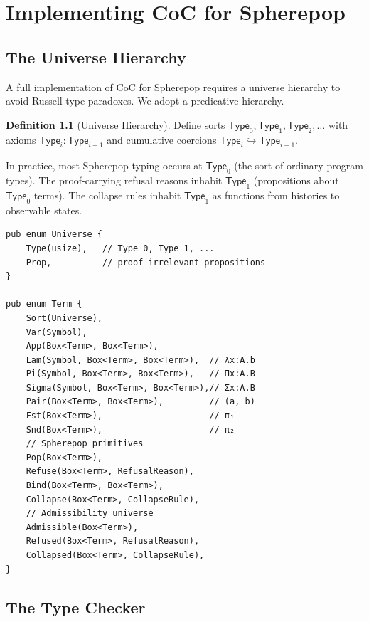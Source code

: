 \documentclass[12pt, a4paper, openany]{book}
\theoremstyle{plain}
\theoremstyle{definition}
\newtheorem{definition}[theorem]{Definition}
\theoremstyle{remark}
\begin{document}
\chapter{Implementing CoC for Spherepop}

\section{The Universe Hierarchy}

A full implementation of CoC for Spherepop requires a universe hierarchy to avoid
Russell-type paradoxes. We adopt a predicative hierarchy.

\begin{definition}[Universe Hierarchy]
Define sorts $\mathsf{Type}_0, \mathsf{Type}_1, \mathsf{Type}_2, \ldots$ with
axioms $\mathsf{Type}_i : \mathsf{Type}_{i+1}$ and cumulative coercions
$\mathsf{Type}_i \hookrightarrow \mathsf{Type}_{i+1}$.
\end{definition}

In practice, most Spherepop typing occurs at $\mathsf{Type}_0$ (the sort of
ordinary program types). The proof-carrying refusal reasons inhabit
$\mathsf{Type}_1$ (propositions about $\mathsf{Type}_0$ terms). The collapse
rules inhabit $\mathsf{Type}_1$ as functions from histories to observable states.

\begin{lstlisting}[style=rust, caption={Universe levels in the Spherepop type checker}]
pub enum Universe {
    Type(usize),   // Type_0, Type_1, ...
    Prop,          // proof-irrelevant propositions
}

pub enum Term {
    Sort(Universe),
    Var(Symbol),
    App(Box<Term>, Box<Term>),
    Lam(Symbol, Box<Term>, Box<Term>),  // λx:A.b
    Pi(Symbol, Box<Term>, Box<Term>),   // Πx:A.B
    Sigma(Symbol, Box<Term>, Box<Term>),// Σx:A.B
    Pair(Box<Term>, Box<Term>),         // (a, b)
    Fst(Box<Term>),                     // π₁
    Snd(Box<Term>),                     // π₂
    // Spherepop primitives
    Pop(Box<Term>),
    Refuse(Box<Term>, RefusalReason),
    Bind(Box<Term>, Box<Term>),
    Collapse(Box<Term>, CollapseRule),
    // Admissibility universe
    Admissible(Box<Term>),
    Refused(Box<Term>, RefusalReason),
    Collapsed(Box<Term>, CollapseRule),
}
\end{lstlisting}

\section{The Type Checker}
\end{document}
